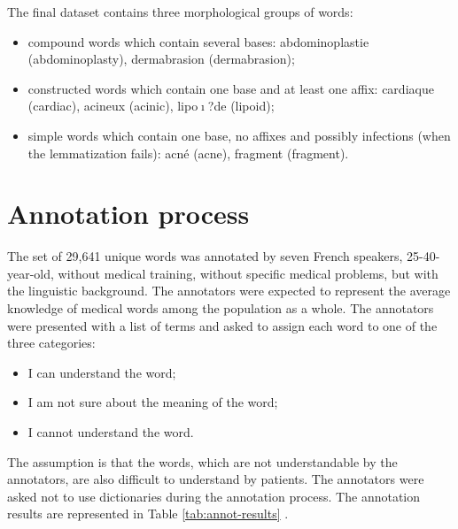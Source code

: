 The final dataset contains three morphological groups of words:
\begin{itemize}
    \item  compound words which contain several bases: abdominoplastie (abdominoplasty), dermabrasion (dermabrasion);
    \item  constructed words which contain one base and at least one affix: cardiaque (cardiac), acineux (acinic), lipo$\mathrm{\imath}$?de (lipoid);
    \item  simple words which contain one base, no affixes and possibly infections (when the lemmatization fails): acn\'{e} (acne), fragment (fragment).
\end{itemize}

\section{Annotation process}
\label{sec:annotation-process}
The set of 29,641 unique words was annotated by seven French speakers, 25-40-year-old, without medical training, without specific medical problems, but with the linguistic background. The annotators were expected to represent the average knowledge of medical words among the population as a whole. The annotators were presented with a list of terms and asked to assign each word to one of the three categories:

\begin{itemize}
    \item  I can understand the word;
    \item  I am not sure about the meaning of the word;
    \item  I cannot understand the word.
\end{itemize}
The assumption is that the words, which are not understandable by the annotators, are also difficult to understand by patients. The annotators were asked not to use dictionaries during the annotation process. The annotation results are represented in Table \ref{tab:annot-results} .

